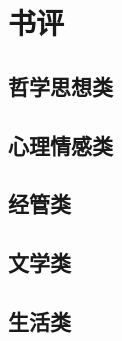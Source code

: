 \documentclass[linespread=1.5]{ctexbook}
\title{\heiti{阅读、电影}}
\author{\kaishu{北方以北}}
\begin{document}
\maketitle

\tableofcontents

\chapter{书评}

\section{哲学思想类}










\clearpage

\section{心理情感类}


\clearpage

\section{经管类}






\clearpage

\section{文学类}


































\clearpage

\section{生活类}




\end{document}
